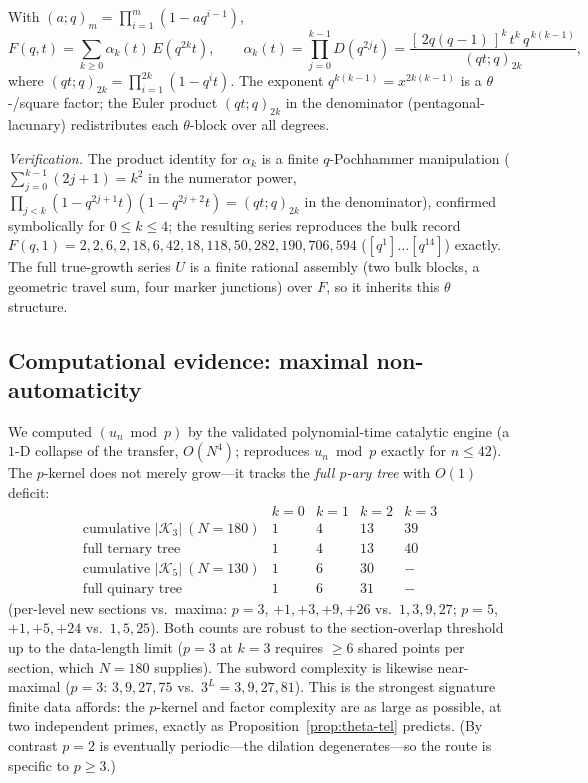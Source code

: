 \begin{proposition}\label{prop:theta-tel}
With $(a;q)_m=\prod_{i=1}^{m}(1-aq^{i-1})$,
\[
   F(q,t)=\sum_{k\ge0}\alpha_k(t)\,E(q^{2k}t),
   \qquad
   \alpha_k(t)=\prod_{j=0}^{k-1}D(q^{2j}t)
             =\frac{[\,2q(q-1)\,]^{k}\,t^{k}\,q^{\,k(k-1)}}{(qt;q)_{2k}},
\]
where $(qt;q)_{2k}=\prod_{i=1}^{2k}(1-q^{i}t)$. The exponent $q^{k(k-1)}=x^{2k(k-1)}$
is a $\theta$\nobreakdash-/square factor; the Euler product $(qt;q)_{2k}$ in the
denominator (pentagonal-lacunary) redistributes each $\theta$-block over all
degrees.
\end{proposition}

\noindent\emph{Verification.} The product identity for $\alpha_k$ is a finite
$q$-Pochhammer manipulation ($\sum_{j=0}^{k-1}(2j+1)=k^2$ in the numerator power,
$\prod_{j<k}(1-q^{2j+1}t)(1-q^{2j+2}t)=(qt;q)_{2k}$ in the denominator), confirmed
symbolically for $0\le k\le4$; the resulting series reproduces the bulk record
$F(q,1)=2,2,6,2,18,6,42,18,118,50,282,190,706,594$ ($[q^{1}]\dots[q^{14}]$)
exactly. The full true-growth series $U$ is a finite rational assembly (two bulk
blocks, a geometric travel sum, four marker junctions) over $F$, so it inherits
this $\theta$ structure.

\subsection{Computational evidence: maximal non-automaticity}
We computed $(u_n\bmod p)$ by the validated polynomial-time catalytic engine
(a $1$-D collapse of the transfer, $O(N^4)$; reproduces $u_n\bmod p$ exactly for
$n\le42$). The $p$-kernel does not merely grow---it tracks the \emph{full
$p$-ary tree} with $O(1)$ deficit:
\[
\begin{array}{l|llll}
 & k=0 & k=1 & k=2 & k=3\\\hline
 \text{cumulative }|\mathcal K_3|\ (N=180) & 1 & 4 & 13 & 39\\
 \text{full ternary tree} & 1 & 4 & 13 & 40\\[2pt]
 \text{cumulative }|\mathcal K_5|\ (N=130) & 1 & 6 & 30 & -\\
 \text{full quinary tree} & 1 & 6 & 31 & -
\end{array}
\]
(per-level new sections vs.\ maxima: $p=3$, $+1,+3,+9,+26$ vs.\ $1,3,9,27$;
$p=5$, $+1,+5,+24$ vs.\ $1,5,25$). Both counts are robust to the section-overlap
threshold up to the data-length limit ($p=3$ at $k=3$ requires $\ge6$ shared
points per section, which $N=180$ supplies). The subword complexity is likewise
near-maximal ($p=3$: $3,9,27,75$ vs.\ $3^L=3,9,27,81$). This is the strongest
signature finite data affords: the $p$-kernel and factor complexity are as large
as possible, at two independent primes, exactly as
Proposition~\ref{prop:theta-tel} predicts. (By contrast $p=2$ is eventually
periodic---the dilation degenerates---so the route is specific to $p\ge3$.)

